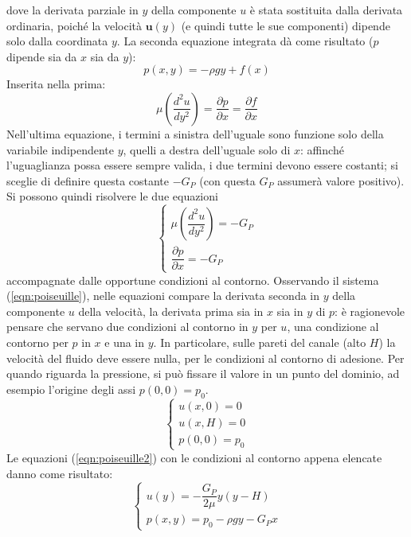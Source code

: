  dove la derivata parziale in $y$ della componente $u$ è stata sostituita dalla
 derivata ordinaria, poiché la velocità $\bm{u}(y)$ (e quindi tutte le sue componenti)
 dipende solo dalla coordinata $y$.
La seconda equazione integrata dà come risultato ($p$ dipende sia da $x$ sia da $y$):
 \begin{equation}
  p(x,y) = -\rho g y + f(x)
 \end{equation}
Inserita nella prima:
 \begin{equation}
 \mu \left( \dfrac{d^2 u}{d y^2} \right) =
 \dfrac{\partial p}{\partial x} = \dfrac{\partial f}{\partial x}
 \end{equation}
Nell'ultima equazione, i termini a sinistra dell'uguale sono funzione solo 
 della variabile indipendente $y$, quelli a destra dell'uguale solo di $x$:
 affinché l'uguaglianza possa essere sempre valida, i due termini devono essere costanti;
 si sceglie di definire questa costante $-G_P$ (con questa $G_P$ assumerà valore positivo).
Si possono quindi risolvere le due equazioni
\begin{equation}\label{eqn:poiseuille2}
\begin{cases}
  \mu \left( \dfrac{d^2 u}{d y^2} \right) = - G_P \\
  \dfrac{\partial p}{\partial x} = -G_P
\end{cases}
\end{equation}
 accompagnate dalle opportune condizioni al contorno. Osservando il sistema
 (\ref{eqn:poiseuille}), nelle equazioni compare la derivata seconda in $y$
 della componente $u$ della velocità, la derivata prima sia in $x$ sia in $y$
 di $p$: è ragionevole pensare che servano due condizioni al contorno in $y$
 per $u$, una condizione al contorno per $p$ in $x$ e una in $y$.
In particolare, sulle pareti del canale (alto $H$) la velocità del fluido deve
 essere nulla, per le condizioni al contorno di adesione. Per quando riguarda
 la pressione, si può fissare il valore in un punto del dominio, ad esempio
 l'origine degli assi $p(0,0) = p_0$.
 \begin{equation}
 \begin{cases}
  u(x,0) = 0 \\
  u(x,H) = 0 \\
  p(0,0) = p_0
 \end{cases}
 \end{equation}
 Le equazioni (\ref{eqn:poiseuille2}) con le condizioni al contorno appena
 elencate danno come risultato:
 \begin{equation}
  \begin{cases}
    u(y) = -\dfrac{G_P}{2 \mu} y (y - H) \\
    p(x,y) = p_0 - \rho g y - G_P x
  \end{cases}
 \end{equation}

